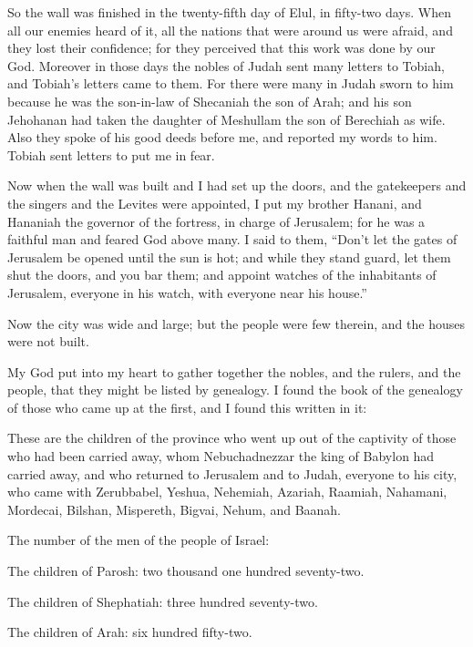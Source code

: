 \myverse{}So the wall was finished in the twenty-fifth day of Elul, in
fifty-two days.
\myverse{}When all our enemies heard of it, all the nations that were around us were
afraid, and they lost their confidence; for they perceived that this work was done by our God.
\myverse{}Moreover in those days the nobles of Judah sent many letters to Tobiah, and
Tobiah’s letters came to them.
\myverse{}For there were many in Judah sworn to him because he was the son-in-law of
Shecaniah the son of Arah; and his son Jehohanan had taken the daughter of Meshullam the son of Berechiah
as wife.
\myverse{}Also they spoke of his good deeds before me, and reported my words to him.
Tobiah sent letters to put me in fear.


\mychapter{} \myverse*{}Now when the wall was built and I had set up the doors, and the
gatekeepers and the singers and the Levites were appointed,
\myverse{}I put my brother Hanani, and Hananiah the governor of the fortress, in charge
of Jerusalem; for he was a faithful man and feared God above many.
\myverse{}I said to them, “Don’t let the gates of Jerusalem be opened until the sun is
hot; and while they stand guard, let them shut the doors, and you bar them; and appoint watches of the
inhabitants of Jerusalem, everyone in his watch, with everyone near his house.”

\myverse{}Now the city was wide and large; but the people were few therein,
and the houses were not built.

\myverse{}My God put into my heart to gather together the nobles, and the
rulers, and the people, that they might be listed by genealogy. I found the book of the genealogy of those
who came up at the first, and I found this written in it:

\myverse{}These are the children of the province who went up out of the captivity
of those who had been carried away, whom Nebuchadnezzar the king of Babylon had carried away, and who
returned to Jerusalem and to Judah, everyone to his city,
\myverse{}who came with Zerubbabel, Yeshua, Nehemiah, Azariah, Raamiah, Nahamani, Mordecai,
Bilshan, Mispereth, Bigvai, Nehum, and Baanah.

The number of the men of the people of Israel:

\myverse{}The children of Parosh: two thousand one hundred seventy-two.

\myverse{}The children of Shephatiah: three hundred seventy-two.

\myverse{}The children of Arah: six hundred fifty-two.

